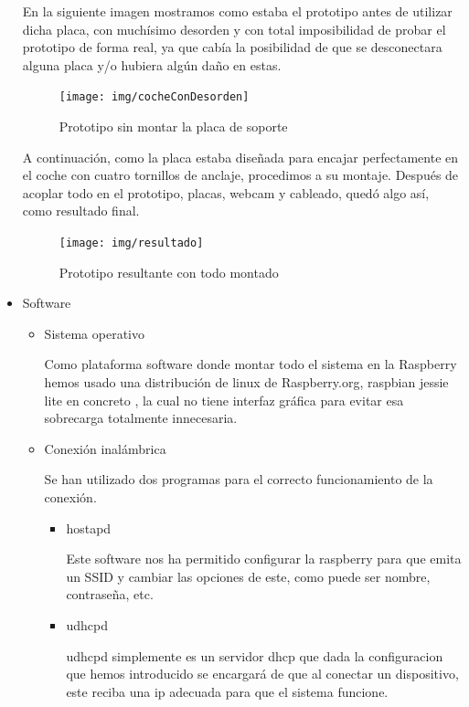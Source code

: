\documentclass{pclass}
\begin{document}
\begin{itemize}
En la siguiente imagen mostramos como estaba el prototipo antes de utilizar dicha placa, con muchísimo desorden y con total imposibilidad de probar el prototipo de forma real, ya que cabía la posibilidad de que se desconectara alguna placa y/o hubiera algún daño en estas.

\begin{figure}[H]
	\centering
	\texttt{[image: img/cocheConDesorden]}
	\caption{Prototipo sin montar la placa de soporte}
	\label{fig:cochesinsoporte}
\end{figure}

A continuación, como la placa estaba diseñada para encajar perfectamente en el coche con cuatro tornillos de anclaje, procedimos a su montaje. Después de acoplar todo en el prototipo, placas, webcam y cableado, quedó algo así, como resultado final.

\begin{figure}[H]
	\centering
	\texttt{[image: img/resultado]}
	\caption{Prototipo resultante con todo montado}
	\label{fig:cochesResultante}
\end{figure}

\item Software


\begin{itemize}
	
	\item Sistema operativo
	
	Como plataforma software donde montar todo el sistema en la Raspberry hemos usado una distribución de linux de Raspberry.org, raspbian jessie lite en concreto , la cual no tiene interfaz gráfica para evitar esa sobrecarga totalmente innecesaria.
	\medskip
	
	\item Conexión inalámbrica
	
	Se han utilizado dos programas para el correcto funcionamiento de la conexión.
	
		\begin{itemize}
			\item hostapd
			\smallskip
			
			Este software nos ha permitido configurar la raspberry para que emita un SSID y cambiar las opciones de este, como puede ser nombre, contraseña, etc.
			\smallskip
			
			\item udhcpd
			\smallskip
			
			udhcpd simplemente es un servidor dhcp que dada la configuracion que hemos introducido se encargará de que al conectar un dispositivo, este reciba una ip adecuada para que el sistema funcione.
			

\end{itemize}
\end{itemize}
\end{itemize}
\end{document}
